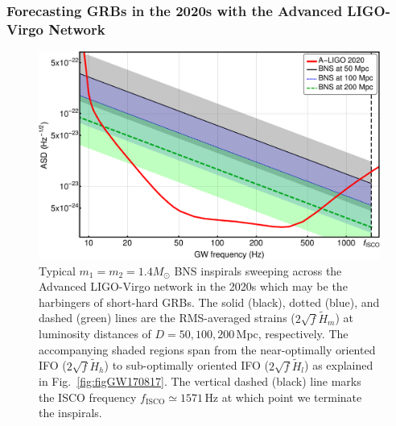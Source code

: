 \documentclass[prd,amsmath,amssymb,aps,floats,amsfonts,notitlepage,superscriptaddress,eqsecnum,nofootinbib,10pt]{revtex4-1}
\begin{document}
\subsubsection{Forecasting GRBs in the 2020s with the Advanced LIGO-Virgo Network}\label{Sec:ALIGO2020}
%
%
\begin{figure}[ht!]
\includegraphics[width=\linewidth]{../Figures/ALigo_strains.pdf}
\caption{Typical $m_1=m_2=1.4 M_\odot$ BNS inspirals sweeping across the Advanced LIGO-Virgo network in the 2020s
which may be the harbingers of short-hard GRBs.
The solid (black), dotted (blue), and dashed (green) lines are the RMS-averaged strains ($2\sqrt{f}\tilde{H}_m$) at luminosity distances of $D=50, 100, 200\,$Mpc, respectively. The accompanying shaded regions span from the near-optimally oriented IFO 
($2\sqrt{f}\tilde{H}_h$) to
sub-optimally oriented IFO ($2\sqrt{f}\tilde{H}_l$) as explained in Fig.~\ref{fig:figGW170817}.
The vertical dashed (black) line marks the ISCO frequency $f_\text{ISCO} \simeq 1571\,$Hz at which point we terminate the inspirals.
}
\label{fig:LIGO2020}
\end{figure}
%
%
\end{document}
